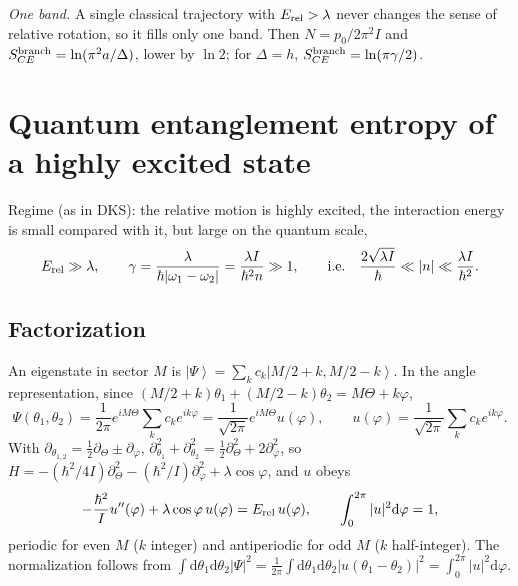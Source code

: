 \documentclass[aps,pra,onecolumn,notitlepage,nofootinbib,11pt]{revtex4-2}
\newcommand{\ket}[1]{\left|#1\right\rangle}
\newcommand{\dd}{\mathrm{d}}
\newcommand{\Erel}{E_{\rm rel}}
\begin{document}
\emph{One band.} A single classical trajectory with $\Erel>\lambda$ never changes the
sense of relative rotation, so it fills only one band. Then $N=p_{0}/2\pi^{2}I$ and
$S_{CE}^{\rm branch}=\ln(\pi^{2}a/\Delta)$, lower by $\ln2$; for $\Delta=h$,
$S_{CE}^{\rm branch}=\ln(\pi\gamma/2)$.

\section{Quantum entanglement entropy of a highly excited state}

Regime (as in DKS): the relative motion is highly excited, the interaction energy is
small compared with it, but large on the quantum scale,
\begin{equation}
\Erel\gg\lambda,\qquad\gamma=\frac{\lambda}{\hbar|\omega_{1}-\omega_{2}|}=\frac{\lambda I}{\hbar^{2}n}\gg1,
\qquad\text{i.e.}\quad\frac{2\sqrt{\lambda I}}{\hbar}\ll|n|\ll\frac{\lambda I}{\hbar^{2}}.
\label{eq:regime}
\end{equation}

\subsection{Factorization}

An eigenstate in sector $M$ is $\ket\Psi=\sum_{k}c_{k}\ket{M/2+k,M/2-k}$. In the angle
representation, since $(M/2+k)\theta_{1}+(M/2-k)\theta_{2}=M\Theta+k\varphi$,
\begin{equation}
\Psi(\theta_{1},\theta_{2})=\frac{1}{2\pi}e^{iM\Theta}\sum_{k}c_{k}e^{ik\varphi}
=\frac{1}{\sqrt{2\pi}}e^{iM\Theta}u(\varphi),\qquad
u(\varphi)=\frac{1}{\sqrt{2\pi}}\sum_{k}c_{k}e^{ik\varphi}.
\label{eq:factor}
\end{equation}
With $\partial_{\theta_{1,2}}=\tfrac12\partial_{\Theta}\pm\partial_{\varphi}$,
$\partial_{\theta_{1}}^{2}+\partial_{\theta_{2}}^{2}=\tfrac12\partial_{\Theta}^{2}+2\partial_{\varphi}^{2}$,
so $H=-(\hbar^{2}/4I)\partial_{\Theta}^{2}-(\hbar^{2}/I)\partial_{\varphi}^{2}+\lambda\cos\varphi$,
and $u$ obeys
\begin{equation}
-\frac{\hbar^{2}}{I}u''(\varphi)+\lambda\cos\varphi\,u(\varphi)=\Erel\,u(\varphi),\qquad
\int_{0}^{2\pi}|u|^{2}\dd\varphi=1,
\label{eq:pendulum}
\end{equation}
periodic for even $M$ ($k$ integer) and antiperiodic for odd $M$ ($k$ half-integer).
The normalization follows from
$\int\dd\theta_{1}\dd\theta_{2}|\Psi|^{2}=\frac{1}{2\pi}\int\dd\theta_{1}\dd\theta_{2}
|u(\theta_{1}-\theta_{2})|^{2}=\int_{0}^{2\pi}|u|^{2}\dd\varphi$.
\end{document}
